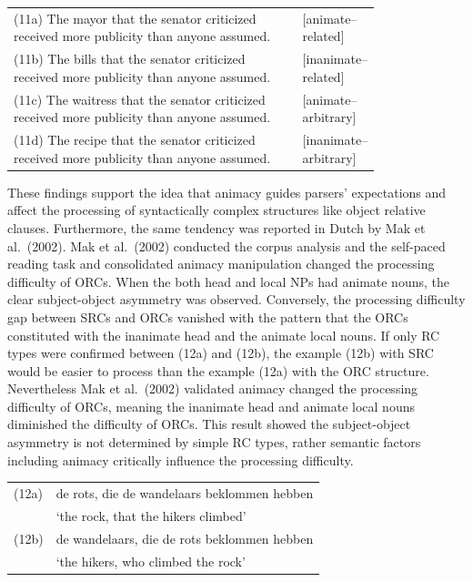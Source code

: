 \documentclass[
]{article}
\begin{document}
\vspace{1em}

\setlength{\parindent}{0pt}
\noindent
\begin{tabular}[t]{@{}p{0.8\linewidth}l@{}}
(11a) The mayor that the senator criticized received more publicity than anyone assumed. & [animate–related] \\
(11b) The bills that the senator criticized received more publicity than anyone assumed. & [inanimate–related] \\
(11c) The waitress that the senator criticized received more publicity than anyone assumed. & [animate–arbitrary] \\
(11d) The recipe that the senator criticized received more publicity than anyone assumed. & [inanimate–arbitrary] \\
\end{tabular}

\vspace{1em}

\setlength{\parindent}{1.27cm}

These findings support the idea that animacy guides parsers'
expectations and affect the processing of syntactically complex
structures like object relative clauses. Furthermore, the same tendency
was reported in Dutch by Mak et al.~(2002). Mak et al.~(2002) conducted
the corpus analysis and the self-paced reading task and consolidated
animacy manipulation changed the processing difficulty of ORCs. When the
both head and local NPs had animate nouns, the clear subject-object
asymmetry was observed. Conversely, the processing difficulty gap
between SRCs and ORCs vanished with the pattern that the ORCs
constituted with the inanimate head and the animate local nouns. If only
RC types were confirmed between (12a) and (12b), the example (12b) with
SRC would be easier to process than the example (12a) with the ORC
structure. Nevertheless Mak et al.~(2002) validated animacy changed the
processing difficulty of ORCs, meaning the inanimate head and animate
local nouns diminished the difficulty of ORCs. This result showed the
subject-object asymmetry is not determined by simple RC types, rather
semantic factors including animacy critically influence the processing
difficulty.

\vspace{1em}
\setlength{\parindent}{0pt}
\noindent
\begin{tabular}[t]{@{}ll}
(12a) & de rots, die de wandelaars beklommen hebben \\
      & ‘the rock, that the hikers climbed’ \\
(12b) & de wandelaars, die de rots beklommen hebben \\
      & ‘the hikers, who climbed the rock’ \\
\end{tabular}
\end{document}
